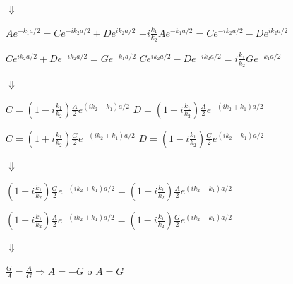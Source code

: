 \documentclass[oneside]{book}
\numberwithin{equation}{section}
\numberwithin{figure}{section}
\numberwithin{table}{section}
\begin{document}
				\begin{center}
					$\Downarrow$
				\end{center}
				 
				\begin{center}
					$\displaystyle Ae^{-k_1a/2}=Ce^{-ik_2a/2}+De^{ik_2a/2}$	\hspace{1cm}	$\displaystyle -i\frac{k_1}{k_2}Ae^{-k_1a/2}=Ce^{-ik_2a/2}-De^{ik_2a/2}$		
				\end{center}
				\begin{center}
					$\displaystyle Ce^{ik_2a/2}+De^{-ik_2a/2}=Ge^{-k_1a/2}$	\hspace{1cm} $\displaystyle Ce^{ik_2a/2}-De^{-ik_2a/2}=i\frac{k_1}{k_2}Ge^{-k_1a/2}$		
				\end{center}
				
				\begin{center}
					$\Downarrow$
				\end{center}
				
				\begin{center}
					$\displaystyle C=(1-i\frac{k_1}{k_2})\frac{A}{2}e^{(ik_2-k_1)a/2}$	\hspace{1cm}	$\displaystyle D=(1+i\frac{k_1}{k_2})\frac{A}{2}e^{-(ik_2+k_1)a/2}$		
				\end{center}
				\begin{center}
					$\displaystyle C=(1+i\frac{k_1}{k_2})\frac{G}{2}e^{-(ik_2+k_1)a/2}$	\hspace{1cm} $\displaystyle D=(1-i\frac{k_1}{k_2})\frac{G}{2}e^{(ik_2-k_1)a/2}$		
				\end{center}
				
				\begin{center}
					$\Downarrow$
				\end{center}
				
				\begin{center}
					$\displaystyle (1+i\frac{k_1}{k_2})\frac{G}{2}e^{-(ik_2+k_1)a/2}=(1-i\frac{k_1}{k_2})\frac{A}{2}e^{(ik_2-k_1)a/2}$
				\end{center}
				\begin{center}
					 $\displaystyle (1+i\frac{k_1}{k_2})\frac{A}{2}e^{-(ik_2+k_1)a/2}=(1-i\frac{k_1}{k_2})\frac{G}{2}e^{(ik_2-k_1)a/2}$		
				\end{center}
				
				\begin{center}
					$\Downarrow$
				\end{center}
				
				\begin{center}
					$\displaystyle \frac{G}{A}=\frac{A}{G} \Rightarrow A=-G \text{ o } A=G$
				\end{center}
		
\end{document}
